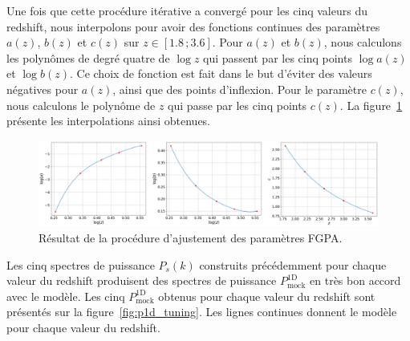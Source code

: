 Une fois que cette procédure itérative a convergé pour les cinq valeurs du redshift, nous interpolons pour avoir des fonctions continues des paramètres $a(z)$, $b(z)$ et $c(z)$ sur $z \in [\num{1.8} \, ; \num{3.6}]$. Pour $a(z)$ et $b(z)$, nous calculons les polynômes de degré quatre de $\log z$ qui passent par les cinq points $\log a(z)$ et $\log b(z)$. Ce choix de fonction est fait dans le but d'éviter des valeurs négatives pour $a(z)$, ainsi que des points d'inflexion. Pour le paramètre $c(z)$, nous calculons le polynôme de $z$ qui passe par les cinq points $c(z)$.
La figure~\ref{fig:params} présente les interpolations ainsi obtenues.
\begin{figure}
  \centering
  \includegraphics[scale=0.4]{params}
  \caption{Résultat de la procédure d'ajustement des paramètres FGPA.}
  \label{fig:params}
\end{figure}
Les cinq spectres de puissance $P_{s}(k)$ construits précédemment pour chaque valeur du redshift produisent des spectres de puissance $P^{\mathrm{1D}}_{\mathrm{mock}}$ en très bon accord avec le modèle. Les cinq $P^{\mathrm{1D}}_{\mathrm{mock}}$ obtenus pour chaque valeur du redshift sont présentés sur la figure~\ref{fig:p1d_tuning}. Les lignes continues donnent le modèle pour chaque valeur du redshift.
